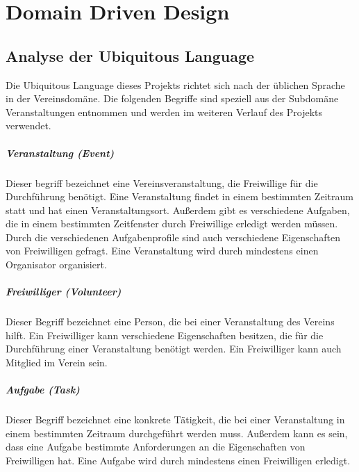 \chapter{Domain Driven Design}
\label{chapter:domain_driven_design}

\section{Analyse der Ubiquitous Language}
\label{section:analyse_der_ubiquitous_language}

Die Ubiquitous Language dieses Projekts richtet sich nach der üblichen Sprache in der Vereinsdomäne. Die folgenden Begriffe sind speziell aus der Subdomäne \glqq Veranstaltungen\grqq{} entnommen und werden im weiteren Verlauf des Projekts verwendet.

\paragraph{\glqq Veranstaltung\grqq{} (Event)}
Dieser begriff bezeichnet eine Vereinsveranstaltung, die Freiwillige für die Durchführung benötigt. Eine Veranstaltung findet in einem bestimmten Zeitraum statt und hat einen Veranstaltungsort. Außerdem gibt es verschiedene Aufgaben, die in einem bestimmten Zeitfenster durch Freiwillige erledigt werden müssen. Durch die verschiedenen Aufgabenprofile sind auch verschiedene Eigenschaften von Freiwilligen gefragt. Eine Veranstaltung wird durch mindestens einen Organisator organisiert.

\paragraph{\glqq Freiwilliger\grqq{} (Volunteer)}
Dieser Begriff bezeichnet eine Person, die bei einer Veranstaltung des Vereins hilft. Ein Freiwilliger kann verschiedene Eigenschaften besitzen, die für die Durchführung einer Veranstaltung benötigt werden. Ein Freiwilliger kann auch Mitglied im Verein sein.

\paragraph{\glqq Aufgabe\grqq{} (Task)}
Dieser Begriff bezeichnet eine konkrete Tätigkeit, die bei einer Veranstaltung in einem bestimmten Zeitraum durchgeführt werden muss. Außerdem kann es sein, dass eine Aufgabe bestimmte Anforderungen an die Eigenschaften von Freiwilligen hat. Eine Aufgabe wird durch mindestens einen Freiwilligen erledigt.

